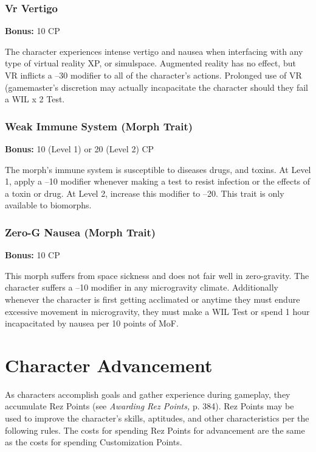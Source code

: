 \subsubsection{Vr Vertigo}

\textbf{Bonus:} 10 CP

The character experiences intense vertigo and 
nausea when interfacing with any type of virtual reality
XP, or simulspace. Augmented reality has no effect,
but VR inflicts a –30 modifier to all of the character's 
actions. Prolonged use of VR (gamemaster's discretion
may actually incapacitate the character should
they fail a WIL x 2 Test.

\subsubsection{Weak Immune System (Morph Trait)}

\textbf{Bonus:} 10 (Level 1) or 20 (Level 2) CP

The morph's immune system is susceptible to diseases
drugs, and toxins. At Level 1, apply a –10 modifier
whenever making a test to resist infection or the effects 
of a toxin or drug. At Level 2, increase this modifier to 
–20. This trait is only available to biomorphs.

\subsubsection{Zero-G Nausea (Morph Trait)}

\textbf{Bonus:} 10 CP

This morph suffers from space sickness and does 
not fair well in zero-gravity. The character suffers a 
–10 modifier in any microgravity climate. Additionally
whenever the character is first getting acclimated
or anytime they must endure excessive movement in 
microgravity, they must make a WIL Test or spend 1 
hour incapacitated by nausea per 10 points of MoF.

\section{Character Advancement}

As characters accomplish goals and gather experience 
during gameplay, they accumulate Rez Points (see 
\textit{Awarding Rez Points,} p. 384). Rez Points may be used 
to improve the character's skills, aptitudes, and other 
characteristics per the following rules. The costs for 
spending Rez Points for advancement are the same as 
the costs for spending Customization Points.

